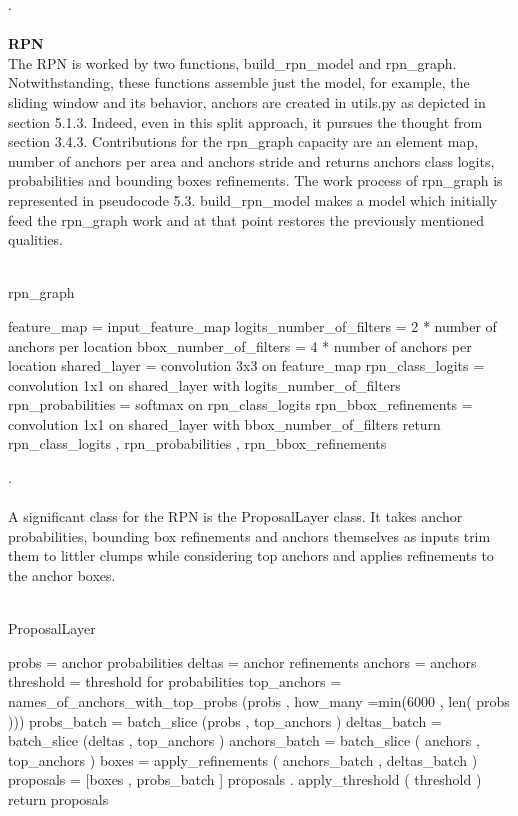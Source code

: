 .\\
\\
 \textbf{RPN}
\\
The RPN is worked by two functions, build\_rpn\_model and rpn\_graph. Notwithstanding, these functions assemble just the model, for example, the sliding window and its behavior, anchors are created in utils.py as depicted in section 5.1.3. Indeed, even in this split approach, it pursues the thought from section 3.4.3. Contributions for the rpn\_graph capacity are an element map, number of anchors per area and anchors stride and returns anchors class logits, probabilities and bounding boxes refinements. The work process of rpn\_graph is represented in pseudocode 5.3. build\_rpn\_model makes a model which initially feed the rpn\_graph work and at that point restores the previously mentioned qualities.
\\
\\
\begin{algorithm}[H]
  \caption{rpn\_graph}
  \SetAlgoLined
  \DontPrintSemicolon
  feature\_map = input\_feature\_map\;
  logits\_number\_of\_filters = 2 * number of anchors per location\;
   bbox\_number\_of\_filters = 4 * number of anchors per location\;
   shared\_layer = convolution 3x3 on feature\_map\;
   rpn\_class\_logits = convolution 1x1 on shared\_layer with logits\_number\_of\_filters\;
  rpn\_probabilities = softmax on rpn\_class\_logits\;
   rpn\_bbox\_refinements = convolution 1x1 on shared\_layer with bbox\_number\_of\_filters\;
   return rpn\_class\_logits , rpn\_probabilities , rpn\_bbox\_refinements\;
  
  \end{algorithm}
  .\\
\\
  A significant class for the RPN is the ProposalLayer class. It takes anchor probabilities, bounding box refinements and anchors themselves as inputs trim them to littler clumps while considering top anchors and applies refinements to the anchor boxes.
\\
\\
\begin{algorithm}[H]
  \caption{ProposalLayer}
  \SetAlgoLined
  \DontPrintSemicolon

probs = anchor probabilities\;
deltas = anchor refinements\;
anchors = anchors\;
threshold = threshold for probabilities\;
top\_anchors = names\_of\_anchors\_with\_top\_probs (probs , how\_many =min(6000 , len( probs )))\;
 probs\_batch = batch\_slice (probs , top\_anchors )\;
 deltas\_batch = batch\_slice (deltas , top\_anchors )\;
 anchors\_batch = batch\_slice ( anchors , top\_anchors )\;
 boxes = apply\_refinements ( anchors\_batch , deltas\_batch )\;
 proposals = [boxes , probs\_batch ]\;
 proposals . apply\_threshold ( threshold )\;
 return proposals\;

  \end{algorithm}
